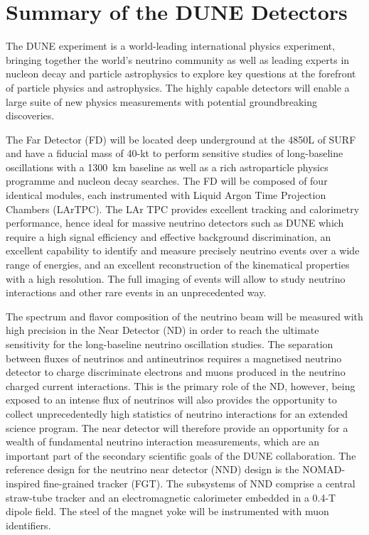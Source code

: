 \chapter{Summary of the DUNE Detectors}
\label{ch:physics-summary}

The DUNE experiment is a world-leading international physics
experiment, bringing together the world's neutrino community as well
as leading experts in nucleon decay and particle astrophysics to
explore key questions at the forefront of particle physics and
astrophysics. The highly capable detectors will enable a
large suite of new physics measurements with potential groundbreaking
discoveries.

The Far Detector (FD) will be located deep underground at the 4850L of
SURF and have a fiducial mass of 40-kt to perform sensitive studies of
long-baseline oscillations with a 1300~km baseline as well as a rich
astroparticle physics programme and nucleon decay searches. The FD
will be composed of four identical modules, each instrumented with
Liquid Argon Time Projection Chambers (LArTPC). The LAr
TPC provides excellent tracking and calorimetry performance, hence
ideal for massive neutrino detectors such as DUNE which require a high
signal efficiency and effective background discrimination, an
excellent capability to identify and measure precisely neutrino events
over a wide range of energies, and an excellent reconstruction of the
kinematical properties with a high resolution. The full imaging of
events will allow to study neutrino interactions and other rare events
in an unprecedented way.

The spectrum and flavor composition of the neutrino beam will be
measured with high precision in the Near Detector (ND) in order to
reach the ultimate sensitivity for the long-baseline neutrino
oscillation studies.  The separation between fluxes of neutrinos and
antineutrinos requires a magnetised neutrino detector to charge
discriminate electrons and muons produced in the neutrino charged
current interactions.  This is the primary role of the ND, however,
being exposed to an intense flux of neutrinos will also provides the
opportunity to collect unprecedentedly high statistics of neutrino
interactions for an extended science program.  The near detector will
therefore provide an opportunity for a wealth of fundamental neutrino
interaction measurements, which are an important part of the secondary
scientific goals of the DUNE collaboration.  The reference design for
the neutrino near detector (NND) design is the NOMAD-inspired
fine-grained tracker (FGT). The subsystems of NND comprise a central
straw-tube tracker and an electromagnetic calorimeter embedded in a
0.4-T dipole field. The steel of the magnet yoke will be instrumented
with muon identifiers.
